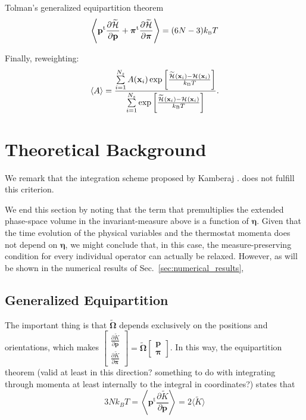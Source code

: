 \documentclass[
journal=jctcce,
layout=twocolumn
]{achemso}
\newcommand{\vt}[1]{\boldsymbol{\mathbf{#1}}}   %
\newcommand{\tr}[1]{#1^\text{t}}                %
\newcommand{\diff}[2]{\frac{\partial #1}{\partial #2}} %
\newcommand{\Ham}[1]{{\mathcal H}_\text{#1}}    %
\newcommand{\modified}[1]{\widetilde{#1}}
\begin{document}
Tolman's generalized equipartition theorem \cite{Uline_2008}
\begin{equation*}
\left\langle \tr{\vt p} \diff{\modified{\Ham{}}}{\vt p} + \tr{\vt \pi} \diff{\modified{\Ham{}}}{\vt \pi} \right\rangle = (6N - 3) k_\text{\tiny B} T
\end{equation*}


Finally, reweighting:
\begin{equation}
\label{eq:reweighting}
\langle A \rangle = \frac{\sum\limits_{i=1}^{N_s} A(\vt x_i) \exp \left[{\frac{\modified{\Ham{}}(\vt x_i) - {\Ham{}}(\vt x_i)}{k_\text{\tiny B} T}}\right]}{\sum\limits_{i=1}^{N_s} \exp \left[{\frac{\modified{\Ham{}}(\vt x_i) - {\Ham{}}(\vt x_i)}{k_\text{\tiny B} T}}\right] }.
\end{equation}

\section{Theoretical Background}


We remark that the integration scheme proposed by Kamberaj .\cite{Kamberaj_2005} does not fulfill this criterion. 

We end this section by noting that the term that premultiplies the extended phase-space volume in the invariant-measure above is a function of $\vt \eta$. Given that the time evolution of the physical variables and the thermostat momenta does not depend on $\vt \eta$, we might conclude that, in this case, the measure-preserving condition for every individual operator can actually be relaxed. However, as will be shown in the numerical results of Sec.~\ref{sec:numerical_results}, 


\subsection{Generalized Equipartition}

The important thing is that $\modified{\mathbf \Omega}$ depends exclusively on the positions and orientations, which makes $\left[\begin{array}{c} \diff{\modified K}{\vt p} \\ \diff{\modified K}{\vt \pi} \end{array}\right] = \modified{\mathbf \Omega} \left[\begin{array}{c} \vt p \\ \vt \pi \end{array}\right]$.
In this way, the equipartition theorem (valid at least in this direction? something to do with integrating through momenta at least internally to the integral in coordinates?) states that
\begin{equation}
\label{eq:equipartition}
3N k_B T = \left\langle \tr{\vt p} \diff{\tilde K}{\vt p} \right\rangle = 2\langle \tilde K \rangle
\end{equation}
\end{document}
